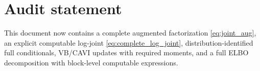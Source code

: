 \documentclass[11pt]{article}
\newcommand{\1}{\mathbb{I}}
\begin{document}
\section*{Audit statement}
This document now contains a complete augmented factorization
\eqref{eq:joint_aug}, an explicit computable log-joint \eqref{eq:complete_log_joint},
distribution-identified full conditionals, VB/CAVI updates with required moments,
and a full ELBO decomposition with block-level computable expressions.
\end{document}
